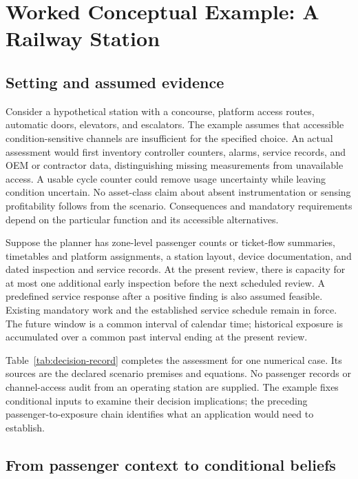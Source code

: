 \documentclass[symmetry,article,submit,pdftex,oneauthor]{Definitions/mdpi}
\begin{document}
\section{Worked Conceptual Example: A Railway Station}
\label{sec:case}

\subsection{Setting and assumed evidence}

Consider a hypothetical station with a concourse, platform access routes, automatic doors, elevators, and escalators. The example assumes that accessible condition-sensitive channels are insufficient for the specified choice. An actual assessment would first inventory controller counters, alarms, service records, and OEM or contractor data, distinguishing missing measurements from unavailable access. A usable cycle counter could remove usage uncertainty while leaving condition uncertain. No asset-class claim about absent instrumentation or sensing profitability follows from the scenario. Consequences and mandatory requirements depend on the particular function and its accessible alternatives.

Suppose the planner has zone-level passenger counts or ticket-flow summaries, timetables and platform assignments, a station layout, device documentation, and dated inspection and service records. At the present review, there is capacity for at most one additional early inspection before the next scheduled review. A predefined service response after a positive finding is also assumed feasible. Existing mandatory work and the established service schedule remain in force. The future window is a common interval of calendar time; historical exposure is accumulated over a common past interval ending at the present review.

Table~\ref{tab:decision-record} completes the assessment for one numerical case. Its sources are the declared scenario premises and equations. No passenger records or channel-access audit from an operating station are supplied. The example fixes conditional inputs to examine their decision implications; the preceding passenger-to-exposure chain identifies what an application would need to establish.

\subsection{From passenger context to conditional beliefs}
\end{document}
